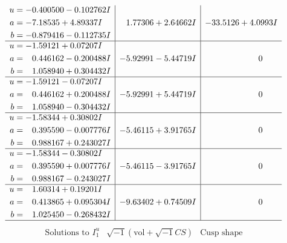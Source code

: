 \documentclass[1p]{elsarticle_modified}
\theoremstyle{definition}
\newcommand{\I}{\sqrt{-1}}
\begin{document}
$$\begin{array}{c|c|c}
\begin{aligned}
u &= -0.400500 - 0.102762 I \\
a &= -7.18535 + 4.89337 I \\
b &= -0.879416 - 0.112735 I\end{aligned}
 & \phantom{-}1.77306 + 2.64662 I & -33.5126 + 4.0993 I \\ \hline\begin{aligned}
u &= -1.59121 + 0.07207 I \\
a &= \phantom{-}0.446162 - 0.200488 I \\
b &= \phantom{-}1.058940 + 0.304432 I\end{aligned}
 & -5.92991 - 5.44719 I & \phantom{-0.000000 } 0 \\ \hline\begin{aligned}
u &= -1.59121 - 0.07207 I \\
a &= \phantom{-}0.446162 + 0.200488 I \\
b &= \phantom{-}1.058940 - 0.304432 I\end{aligned}
 & -5.92991 + 5.44719 I & \phantom{-0.000000 } 0 \\ \hline\begin{aligned}
u &= -1.58344 + 0.30802 I \\
a &= \phantom{-}0.395590 - 0.007776 I \\
b &= \phantom{-}0.988167 + 0.243027 I\end{aligned}
 & -5.46115 + 3.91765 I & \phantom{-0.000000 } 0 \\ \hline\begin{aligned}
u &= -1.58344 - 0.30802 I \\
a &= \phantom{-}0.395590 + 0.007776 I \\
b &= \phantom{-}0.988167 - 0.243027 I\end{aligned}
 & -5.46115 - 3.91765 I & \phantom{-0.000000 } 0 \\ \hline\begin{aligned}
u &= \phantom{-}1.60314 + 0.19201 I \\
a &= \phantom{-}0.413865 + 0.095304 I \\
b &= \phantom{-}1.025450 - 0.268432 I\end{aligned}
 & -9.63402 + 0.74509 I & \phantom{-0.000000 } 0\\
 \hline 
 \end{array}$$\newpage$$\begin{array}{c|c|c}  
\text{Solutions to }I^u_{1}& \I (\text{vol} + \sqrt{-1}CS) & \text{Cusp shape}\\
 \hline 
\begin{aligned}

\end{aligned}
\end{array}$$
\end{document}
